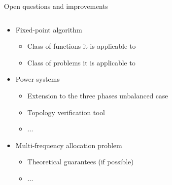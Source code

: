 \documentclass[../main.tex]{subfiles}
\begin{document}
%
%





%
%



\begin{frame}[fragile]{Open questions and improvements}

\begin{columns}[c]

\begin{column}{0.8\linewidth}
\begin{itemize}
\item Fixed-point algorithm
\begin{itemize}
\item Class of functions it is applicable to
\item Class of problems it is applicable to
\end{itemize}
\item Power systems
\begin{itemize}
\item Extension to the three phases unbalanced case
\item Topology verification tool
\item ...
\end{itemize}
\item Multi-frequency allocation problem
\begin{itemize}
\item Theoretical guarantees (if possible)
\item ...
\end{itemize}
\end{itemize}
\end{column}


\end{columns}
\end{frame}
\end{document}
